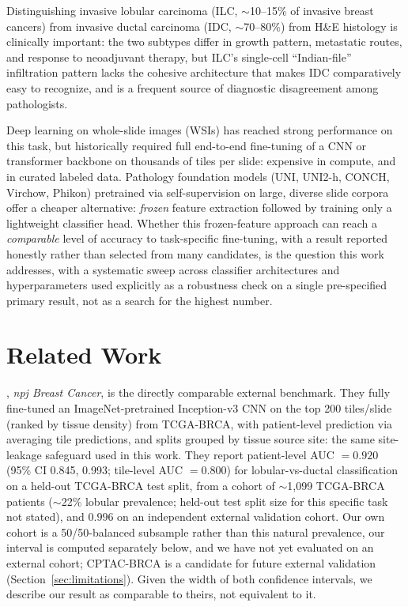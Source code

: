 \documentclass{article}
\begin{document}
Distinguishing invasive lobular carcinoma (ILC, $\sim$10--15\% of invasive breast cancers) from invasive ductal carcinoma (IDC, $\sim$70--80\%) from H\&E histology is clinically important: the two subtypes differ in growth pattern, metastatic routes, and response to neoadjuvant therapy, but ILC's single-cell ``Indian-file'' infiltration pattern lacks the cohesive architecture that makes IDC comparatively easy to recognize, and is a frequent source of diagnostic disagreement among pathologists.

Deep learning on whole-slide images (WSIs) has reached strong performance on this task, but historically required full end-to-end fine-tuning of a CNN or transformer backbone on thousands of tiles per slide: expensive in compute, and in curated labeled data. Pathology foundation models (UNI, UNI2-h, CONCH, Virchow, Phikon) pretrained via self-supervision on large, diverse slide corpora offer a cheaper alternative: \emph{frozen} feature extraction followed by training only a lightweight classifier head. Whether this frozen-feature approach can reach a \emph{comparable} level of accuracy to task-specific fine-tuning, with a result reported honestly rather than selected from many candidates, is the question this work addresses, with a systematic sweep across classifier architectures and hyperparameters used explicitly as a robustness check on a single pre-specified primary result, not as a search for the highest number.

\section{Related Work}

\textbf{\citet{ektefaie2021integrative}}, \emph{npj Breast Cancer}, is the directly comparable external benchmark. They fully fine-tuned an ImageNet-pretrained Inception-v3 CNN on the top 200 tiles/slide (ranked by tissue density) from TCGA-BRCA, with patient-level prediction via averaging tile predictions, and splits grouped by tissue source site: the same site-leakage safeguard used in this work. They report patient-level AUC $=0.920$ (95\% CI 0.845, 0.993; tile-level AUC $=0.800$) for lobular-vs-ductal classification on a held-out TCGA-BRCA test split, from a cohort of $\sim$1{,}099 TCGA-BRCA patients ($\sim$22\% lobular prevalence; held-out test split size for this specific task not stated), and $0.996$ on an independent external validation cohort. Our own cohort is a 50/50-balanced subsample rather than this natural prevalence, our interval is computed separately below, and we have not yet evaluated on an external cohort; CPTAC-BRCA is a candidate for future external validation (Section~\ref{sec:limitations}). Given the width of both confidence intervals, we describe our result as comparable to theirs, not equivalent to it.
\end{document}
